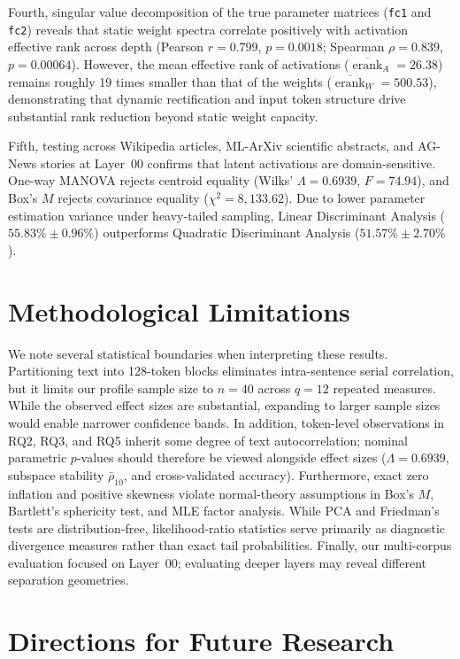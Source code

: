 \documentclass[12pt, a4paper, oneside]{report}
\theoremstyle{definition}
\newcommand{\erank}{\operatorname{erank}}
\begin{document}
Fourth, singular value decomposition of the true parameter matrices (\texttt{fc1} and \texttt{fc2}) reveals that static weight spectra correlate positively with activation effective rank across depth (Pearson $r = 0.799$, $p = 0.0018$; Spearman $\rho = 0.839$, $p = 0.00064$). However, the mean effective rank of activations ($\overline{\erank}_A = 26.38$) remains roughly 19 times smaller than that of the weights ($\overline{\erank}_W = 500.53$), demonstrating that dynamic rectification and input token structure drive substantial rank reduction beyond static weight capacity.

Fifth, testing across Wikipedia articles, ML-ArXiv scientific abstracts, and AG-News stories at Layer~00 confirms that latent activations are domain-sensitive. One-way MANOVA rejects centroid equality (Wilks' $\Lambda = 0.6939$, $F = 74.94$), and Box's $M$ rejects covariance equality ($\chi^2 = 8{,}133.62$). Due to lower parameter estimation variance under heavy-tailed sampling, Linear Discriminant Analysis ($55.83\% \pm 0.96\%$) outperforms Quadratic Discriminant Analysis ($51.57\% \pm 2.70\%$).

\section{Methodological Limitations}

We note several statistical boundaries when interpreting these results. Partitioning text into 128-token blocks eliminates intra-sentence serial correlation, but it limits our profile sample size to $n = 40$ across $q = 12$ repeated measures. While the observed effect sizes are substantial, expanding to larger sample sizes would enable narrower confidence bands. In addition, token-level observations in RQ2, RQ3, and RQ5 inherit some degree of text autocorrelation; nominal parametric $p$-values should therefore be viewed alongside effect sizes ($\Lambda = 0.6939$, subspace stability $\bar{\rho}_{10}$, and cross-validated accuracy). Furthermore, exact zero inflation and positive skewness violate normal-theory assumptions in Box's $M$, Bartlett's sphericity test, and MLE factor analysis. While PCA and Friedman's tests are distribution-free, likelihood-ratio statistics serve primarily as diagnostic divergence measures rather than exact tail probabilities. Finally, our multi-corpus evaluation focused on Layer~00; evaluating deeper layers may reveal different separation geometries.

\section{Directions for Future Research}
\end{document}
